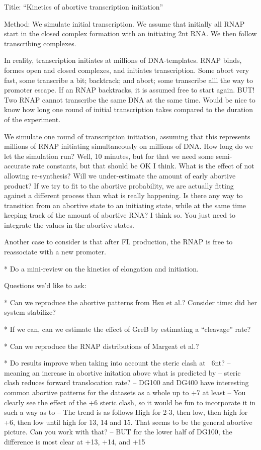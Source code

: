 Title: ``Kinetics of abortive transcription initiation''

Method: We simulate initial transcription. We assume that initially all RNAP
start in the closed complex formation with an initiating 2nt RNA. We then
follow transcribing complexes.

In reality, transcription initiates at millions of DNA-templates. RNAP binds,
formes open and closed complexes, and initiates transcription. Some abort very
fast, some transcribe a bit; backtrack; and abort; some transcribe alll the way
to promoter escape. If an RNAP backtracks, it is assumed free to start again.
BUT! Two RNAP cannot transcribe the same DNA at the same time. Would be nice to
know how long one round of initial transcription takes compared to the duration
of the experiment.

We simulate one round of transcription initiation, assuming that this
represents millions of RNAP initiating simultaneously on millions of DNA. How
long do we let the simulation run? Well, 10 minutes, but for that we need some
semi-accurate rate constants, but that should be OK I think. What is the effect
of not allowing re-synthesis? Will we under-estimate the amount of early
abortive product? If we try to fit to the abortive probability, we are actually
fitting against a different process than what is really happening. Is there any
way to transition from an abortive state to an initiating state, while at the
same time keeping track of the amount of abortive RNA? I think so. You just
need to integrate the values in the abortive states.

Another case to consider is that after FL production, the RNAP is free to
reassociate with a new promoter.


* Do a mini-review on the kinetics of elongation and initiation.

Questions we'd like to ask:

* Can we reproduce the abortive patterns from Hsu et al.?
    Consider time: did her system stabilize?

* If we can, can we estimate the effect of GreB by estimating a ``cleavage'' rate?

* Can we reproduce the RNAP distributions of Margeat et al.? 

* Do results improve when taking into account the steric clash at ~6nt?
    -- meaning an increase in abortive initation above what is predicted by
    -- steric clash reduces forward translocation rate?
    -- DG100 and DG400 have interesting common abortive patterns for the
    datasets as a whole up to +7 at least
    -- You clearly see the effect of the +6 steric clash, so it would be fun
       to incorporate it in such a way as to 
    -- The trend is as follows High for 2-3, then low, then high for +6, then
    low until high for 13, 14 and 15. That seems to be the general abortive
    picture. Can you work with that?
    -- BUT for the lower half of DG100, the difference is most clear at +13,
    +14, and +15

